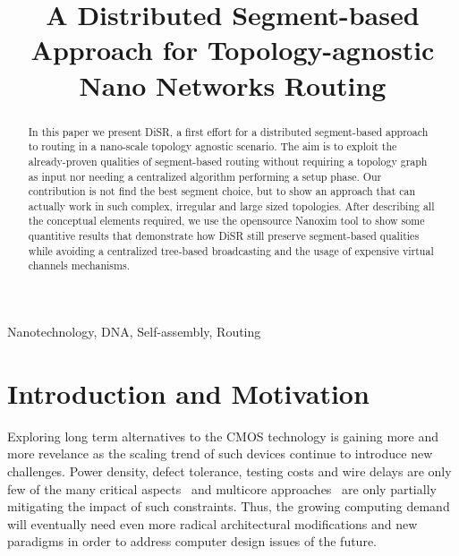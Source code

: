 \documentclass[final,journal,letterpaper]{IEEEtran}
\begin{document}

\title{A Distributed Segment-based Approach for Topology-agnostic Nano Networks Routing} 

\author{
  
  }

\maketitle


\begin{abstract}
In this paper we present DiSR, a first effort for a distributed
segment-based approach to routing in a nano-scale topology agnostic
scenario. The aim is to exploit the already-proven
qualities of segment-based routing without requiring a topology graph
as input nor needing a centralized algorithm 
performing a setup phase.  Our contribution is not find the
best segment choice, but to show an approach that can actually work in
such complex, irregular and large sized topologies. After describing
all the conceptual elements required, we use the opensource Nanoxim tool to show
some quantitive results that demonstrate how DiSR still preserve
segment-based qualities while avoiding a centralized tree-based
broadcasting and the usage of expensive virtual channels mechanisms.
\end{abstract}


\begin{IEEEkeywords}
Nanotechnology, DNA, Self-assembly, Routing
\end{IEEEkeywords}

\section{Introduction and Motivation}
Exploring long term alternatives to the CMOS technology is gaining
more and more revelance as the scaling trend of such devices continue
to introduce new challenges. Power density, defect tolerance, testing
costs and wire delays are only few of the many critical aspects~\cite{}
and multicore approaches~\cite{TODO} are only partially mitigating the
impact of such constraints. Thus, the growing computing demand will
eventually need even more radical architectural modifications and new
paradigms in order to address computer design issues of the future.
\end{document}
